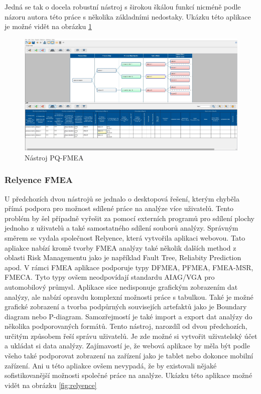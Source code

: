 Jedná se tak o docela robustní nástroj s širokou škálou funkcí nicméně podle názoru autora této práce s několika základními nedostaky. Ukázku této aplikace je možné vidět na obrázku \ref{fig:pq}

\begin{figure}[h]
\centering
	\includegraphics[width=1.0\textwidth]{Figures/pq.jpg}
	\caption{Nástroj PQ-FMEA }
	\label{fig:pq}
\end{figure}

\subsubsection{Relyence FMEA}
U předchozích dvou nástrojů se jednalo o desktopová řešení, kterým chyběla přímá podpora pro možnost sdílené práce na analýze více uživatelů. Tento problém by šel případně vyřešit za pomocí externích programů pro sdílení plochy jednoho z uživatelů a také samostatného sdílení souborů analýzy. Správným směrem se vydala společnost Relyence, která vytvořila aplikaci webovou. Tato apliakce nabízí kromě tvorby FMEA analýzy také několik dalších method z oblasti Risk Managementu jako je například Fault Tree, Reliabity Prediction apod. V rámci FMEA aplikace podporuje typy DFMEA, PFMEA, FMEA-MSR, FMECA. Tyto typy ovšem neodpovídají standardu AIAG/VGA pro automobilový průmysl. Aplikace sice nedisponuje grafickým zobrazením dat analýzy, ale nabízí opravdu komplexní možnosti práce s tabulkou. Také je možné grafické zobrazení a tvorba podpůrných souvisejích artefaktů jako je Boundary diagram nebo P-diagram. Samozřejmostí je také import a export dat analýzy do několika podporovaných formátů. Tento nástroj, narozdíl od dvou předchozích, určitým způsobem řeší správu uživatelů. Je zde možné si vytvořit uživatelský účet a ukládat si data analýzy. Zajímavostí je, že webová aplikace by měla být podle všeho také podporovat zobrazení na zařízení jako je tablet nebo dokonce mobilní zařízení. Ani u této apliakce ovšem nevypadá, že by existovali nějaké sofistikovanější možnosti společné práce na analýze. Ukázku této aplikace možné vidět na obrázku  \ref{fig:relyence}

